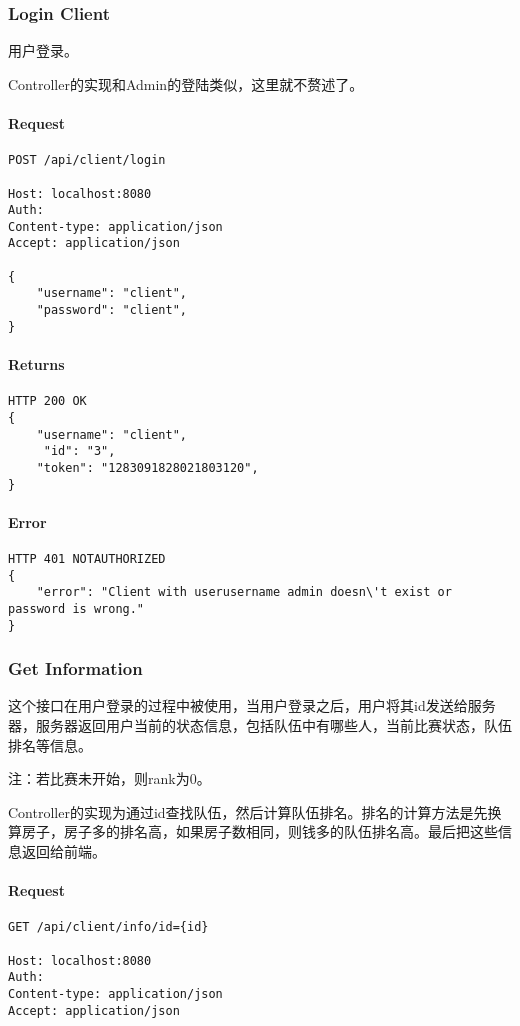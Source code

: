 \documentclass{article}
\begin{document}
\subsubsection{Login Client}
用户登录。

Controller的实现和Admin的登陆类似，这里就不赘述了。

\paragraph*{Request}
\begin{lstlisting}
POST /api/client/login

Host: localhost:8080
Auth:
Content-type: application/json
Accept: application/json

{
    "username": "client",
    "password": "client",
}
\end{lstlisting}

\paragraph*{Returns}
\begin{lstlisting}
HTTP 200 OK
{
    "username": "client",
     "id": "3",
    "token": "1283091828021803120",
}

\end{lstlisting}

\paragraph*{Error}
\begin{lstlisting}
HTTP 401 NOTAUTHORIZED
{
    "error": "Client with userusername admin doesn\'t exist or password is wrong."
}
\end{lstlisting}

\subsubsection{Get Information}
这个接口在用户登录的过程中被使用，当用户登录之后，用户将其id发送给服务器，服务器返回用户当前的状态信息，包括队伍中有哪些人，当前比赛状态，队伍排名等信息。

注：若比赛未开始，则rank为0。

Controller的实现为通过id查找队伍，然后计算队伍排名。排名的计算方法是先换算房子，房子多的排名高，如果房子数相同，则钱多的队伍排名高。最后把这些信息返回给前端。

				\paragraph*{Request}
\begin{lstlisting}
GET /api/client/info/id={id}

Host: localhost:8080
Auth:
Content-type: application/json
Accept: application/json
\end{lstlisting}
\end{document}
